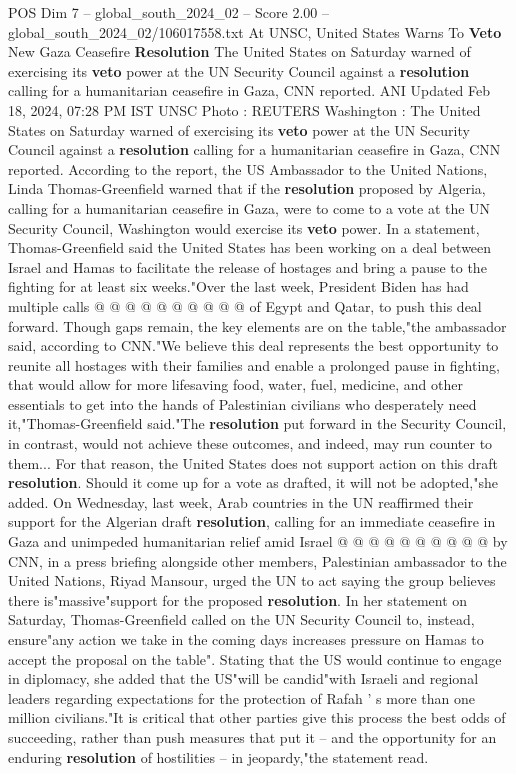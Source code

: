 \begin{textsample}{POS Dim 7 – global\_south\_2024\_02 – Score 2.00 – global\_south\_2024\_02/106017558.txt}  \label{ex:f7_pos_057}
At UNSC, United States Warns To \textbf{Veto} New Gaza Ceasefire \textbf{Resolution} The United States on Saturday warned of exercising its \textbf{veto} power at the UN Security Council against a \textbf{resolution} calling for a humanitarian ceasefire in Gaza, CNN reported.
ANI Updated Feb 18, 2024, 07:28 PM IST UNSC Photo : REUTERS Washington : The United States on Saturday warned of exercising its \textbf{veto} power at the UN Security Council against a \textbf{resolution} calling for a humanitarian ceasefire in Gaza, CNN reported.
According to the report, the US Ambassador to the United Nations, Linda Thomas-Greenfield warned that if the \textbf{resolution} proposed by Algeria, calling for a humanitarian ceasefire in Gaza, were to come to a vote at the UN Security Council, Washington would exercise its \textbf{veto} power.
In a statement, Thomas-Greenfield said the United States has been working on a deal between Israel and Hamas to facilitate the release of hostages and bring a pause to the fighting for at least six weeks."Over the last week, President Biden has had multiple calls @ @ @ @ @ @ @ @ @ @ of Egypt and Qatar, to push this deal forward.
Though gaps remain, the key elements are on the table,"the ambassador said, according to CNN."We believe this deal represents the best opportunity to reunite all hostages with their families and enable a prolonged pause in fighting, that would allow for more lifesaving food, water, fuel, medicine, and other essentials to get into the hands of Palestinian civilians who desperately need it,"Thomas-Greenfield said."The \textbf{resolution} put forward in the Security Council, in contrast, would not achieve these outcomes, and indeed, may run counter to them...
For that reason, the United States does not support action on this draft \textbf{resolution}.
Should it come up for a vote as drafted, it will not be adopted,"she added.
On Wednesday, last week, Arab countries in the UN reaffirmed their support for the Algerian draft \textbf{resolution}, calling for an immediate ceasefire in Gaza and unimpeded humanitarian relief amid Israel @ @ @ @ @ @ @ @ @ @ by CNN, in a press briefing alongside other members, Palestinian ambassador to the United Nations, Riyad Mansour, urged the UN to act saying the group believes there is"massive"support for the proposed \textbf{resolution}.
In her statement on Saturday, Thomas-Greenfield called on the UN Security Council to, instead, ensure"any action we take in the coming days increases pressure on Hamas to accept the proposal on the table".
Stating that the US would continue to engage in diplomacy, she added that the US"will be candid"with Israeli and regional leaders regarding expectations for the protection of Rafah ' s more than one million civilians."It is critical that other parties give this process the best odds of succeeding, rather than push measures that put it -- and the opportunity for an enduring \textbf{resolution} of hostilities -- in jeopardy,"the statement read.

\end{textsample}
